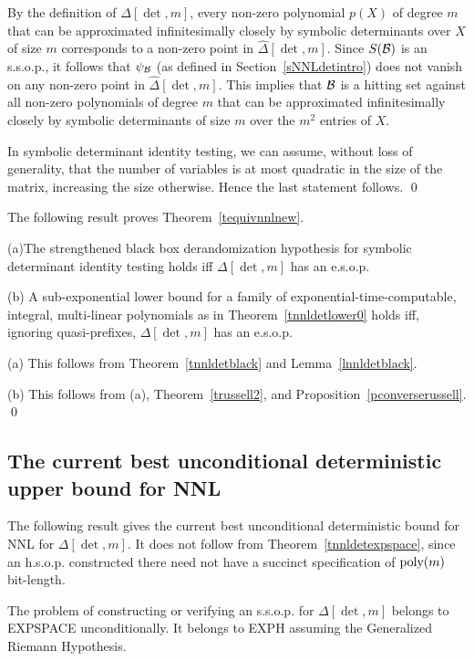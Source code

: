 \documentclass[11pt]{article}
\begin{document}
\proof
By the definition of $\Delta[\det,m]$, every non-zero polynomial $p(X)$ of degree $m$ that can be approximated infinitesimally closely
by symbolic determinants over $X$ of size $m$ corresponds to a non-zero point in $\hat \Delta[\det,m]$. 
Since $S({\cal B})$ is an s.s.o.p., it follows that $\psi_{\cal B}$ (as defined in Section~\ref{sNNLdetintro}) does not vanish 
on any non-zero point in $\hat \Delta[\det,m]$. This implies that 
${\cal B}$ is a hitting set against all non-zero polynomials of degree $m$ that can be approximated infinitesimally closely by
symbolic determinants of size $m$ over the $m^2$ entries of $X$.

In symbolic determinant identity testing, we can assume, without loss of generality, that the number of variables is at most quadratic in the size of the matrix, increasing the size otherwise.
Hence the last statement follows.
\qed 

The following result proves  Theorem~\ref{tequivnnlnew}.

\begin{theorem}  \label{tequisditdet}
\noindent (a)The strengthened black box derandomization hypothesis for  symbolic determinant identity testing holds iff 
$\Delta[\det,m]$ has an e.s.o.p.

\noindent (b) A sub-exponential lower bound for a family of 
exponential-time-computable, integral, multi-linear polynomials as in 
Theorem~\ref{tnnldetlower0} holds
iff, ignoring  quasi-prefixes,  $\Delta[\det,m]$ has an e.s.o.p.
\end{theorem}
\proof 
(a) This follows from Theorem~\ref{tnnldetblack} and Lemma~\ref{lnnldetblack}.

(b) This follows from (a),  Theorem~\ref{trussell2}, and Proposition~\ref{pconverserussell}. \qed 

\subsection{The current best unconditional deterministic upper bound for NNL} \label{scurrentdet}
The following result gives the current best unconditional deterministic bound for NNL for $\Delta[\det,m]$.
It does not follow from Theorem~\ref{tnnldetexpspace}, since an h.s.o.p. constructed there 
need not have a succinct specification of  ${\mbox {poly}}(m)$ bit-length.

\begin{theorem} \label{tssopverifydet}
The problem of constructing or verifying an  s.s.o.p. for $\Delta[\det,m]$ belongs to EXPSPACE unconditionally. It belongs  to 
EXPH assuming the Generalized Riemann Hypothesis.
\end{theorem}
\end{document}
